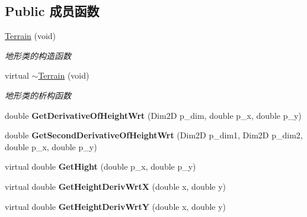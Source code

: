 \subsection*{Public 成员函数}
\begin{DoxyCompactItemize}
\item 
\mbox{\label{classquadruped_1_1Terrain_a47d42e31c537473dba5c75ffae3d0159}} 
\hyperlink{classquadruped_1_1Terrain_a47d42e31c537473dba5c75ffae3d0159}{Terrain} (void)
\begin{DoxyCompactList}\small\item\em 地形类的构造函数 \end{DoxyCompactList}\item 
\mbox{\label{classquadruped_1_1Terrain_adbecae34d794bcf2c6707a695634dec9}} 
virtual \hyperlink{classquadruped_1_1Terrain_adbecae34d794bcf2c6707a695634dec9}{$\sim$\+Terrain} (void)
\begin{DoxyCompactList}\small\item\em 地形类的析构函数 \end{DoxyCompactList}\item 
\mbox{\label{classquadruped_1_1Terrain_a9ba4414b8202818c5de34abde4e653e8}} 
double {\bfseries Get\+Derivative\+Of\+Height\+Wrt} (Dim2D p\+\_\+dim, double p\+\_\+x, double p\+\_\+y)
\item 
\mbox{\label{classquadruped_1_1Terrain_ac863b65b5390ffdb8c7651b0e5ffa5c5}} 
double {\bfseries Get\+Second\+Derivative\+Of\+Height\+Wrt} (Dim2D p\+\_\+dim1, Dim2D p\+\_\+dim2, double p\+\_\+x, double p\+\_\+y)
\item 
\mbox{\label{classquadruped_1_1Terrain_a5dd93d757ea342da62c185e801ea54d6}} 
virtual double {\bfseries Get\+Hight} (double p\+\_\+x, double p\+\_\+y)
\item 
\mbox{\label{classquadruped_1_1Terrain_ae8768e1ea061d8ca892950082c7820f2}} 
virtual double {\bfseries Get\+Height\+Deriv\+WrtX} (double x, double y)
\item 
\mbox{\label{classquadruped_1_1Terrain_af7cd36d8d76d0868c07c5c620f595084}} 
virtual double {\bfseries Get\+Height\+Deriv\+WrtY} (double x, double y)

\end{DoxyCompactItemize}

